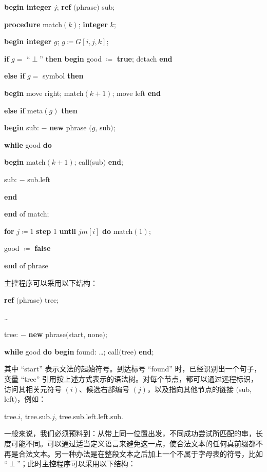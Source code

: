 \documentclass[twoside,11pt,fontset=none]{ctexbook}
\begin{document}
\quad \textbf{begin integer} $j$; \textbf{ref} $($phrase$)$ sub;

\quad \quad \textbf{procedure} match$(k)$; \textbf{integer} $k$;

\quad \quad \textbf{begin integer} $g$; $g\coloneq G[i,j, k]$;

\quad \quad \quad \textbf{if} $g =$ ``$\perp$'' \textbf{then begin} good $\coloneq$ \textbf{true}; detach \textbf{end}

\quad \quad \quad \textbf{else if} $g =$ symbol \textbf{then}

\quad \quad \quad \textbf{begin} move right; match$(k + 1)$; move left \textbf{end}

\quad \quad \quad \textbf{else if} meta$(g)$ \textbf{then}

\quad \quad \quad \textbf{begin} sub: $-$ \textbf{new} phrase $(g$, sub$)$;

\quad \quad \quad \quad \textbf{while} good \textbf{do}

\quad \quad \quad \quad \textbf{begin} match$(k + 1)$; call$($sub$)$ \textbf{end};

\quad \quad \quad \quad \quad sub: $-$ sub.left

\quad \quad \quad \quad \textbf{end}

\quad \quad \textbf{end} of match;

\quad \quad \textbf{for} $j\coloneq 1$ \textbf{step} 1 \textbf{until} $jm[i]$ \textbf{do} match$(1);$

\quad \quad good $\coloneq$ \textbf{false}

\quad \textbf{end} of phrase

\noindent
主控程序可以采用以下结构：

\quad \textbf{ref} $($phrase$)$ tree;

\quad \dots

\quad tree: $-$ \textbf{new} phrase$($start, none$)$;

\quad \textbf{while} good \textbf{do begin} found: \dots; call$($tree$)$ \textbf{end};

\noindent
其中 ``start'' 表示文法的起始符号。到达标号 ``found'' 时，已经识别出一个句子，变量 ``tree'' 引用按上述方式表示的语法树。对每个节点，都可以通过远程标识，访问其相关元符号 $(i)$、候选右部编号 $(j)$，以及指向其他节点的链接 $($sub, left$)$，例如：

\quad tree.$i$, tree.sub.$j$, tree.sub.left.left.sub.

一般来说，我们必须预料到：从带上同一位置出发，不同成功尝试所匹配的串，长度可能不同。可以通过适当定义语言来避免这一点，使合法文本的任何真前缀都不再是合法文本。另一种办法是在整段文本之后加上一个不属于字母表的符号，比如 ``$\perp$''；此时主控程序可以采用以下结构：
\end{document}
